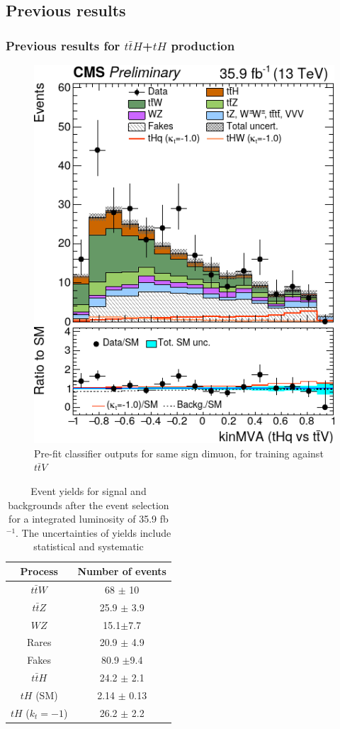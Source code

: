 \documentclass[11pt]{beamer}
\newcommand{\nologo}{\setbeamertemplate{logo}{}}
\begin{document}
{\nologo
\begin{frame}
\subsection{Previous results}
\frametitle{Previous results for $t\bar{t}H$+$tH$ production}
\begin{minipage}[c]{0.45\textwidth}
\begin{figure}
	\centering
	\includegraphics[scale=0.3]{figures/histo.png}
	\caption*{\tiny{Pre-fit classifier outputs for same sign dimuon, for training against $t\bar{t}V$ }}
\end{figure}
\end{minipage}
\hfill
\begin{minipage}[c]{.45\textwidth}
	\small
\begin{table}
	\centering
	\caption*{\tiny{Event yields for signal and backgrounds after the event selection for a integrated luminosity of 35.9 fb$^{-1}$. The uncertainties of yields include statistical and systematic \protect \footnotemark} }
	\begin{tabular}{cc}
		\hline
		Process & Number of events \\
		\hline
		$t\bar{t}W$ & 68 $\pm$ 10 \\
		$t\bar{t}Z$ & 25.9 $\pm$ 3.9\\
		$WZ$ & 15.1$\pm$7.7\\
		Rares & 20.9 $\pm$ 4.9\\
		Fakes & 80.9 $\pm$9.4\\
		$t\bar{t}H$ & 24.2 $\pm$ 2.1 \\
		\hline
		$tH$ (SM) & 2.14 $\pm$ 0.13\\
		$tH$ ($k_t=-1$) &26.2 $\pm$ 2.2
	\end{tabular}	
	\label{tth-table}
\end{table}


\end{minipage}
\end{frame}}
\end{document}
